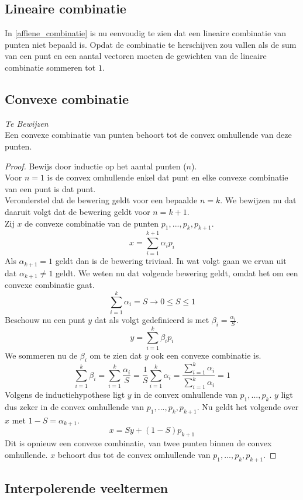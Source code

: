 \documentclass[tmi_notities.tex]{subfiles}
\begin{document}
\subsection{Lineaire combinatie}
In \ref{affiene_combinatie} is nu eenvoudig te zien dat een lineaire combinatie van punten niet bepaald is.
Opdat de combinatie te herschijven zou vallen als de sum van een punt en een aantal vectoren moeten de gewichten van de lineaire combinatie sommeren tot $1$. 

\subsection{Convexe combinatie}
\textit{Te Bewijzen}\\
Een convexe combinatie van punten behoort tot de convex omhullende van deze punten.
\begin{proof}
Bewijs door inductie op het aantal punten ($n$).\\
Voor $n=1$ is de convex omhullende enkel dat punt en elke convexe combinatie van een punt is dat punt.\\
Veronderstel dat de bewering geldt voor een bepaalde $n=k$. We bewijzen nu dat daaruit volgt dat de bewering geldt voor $n=k+1$.\\
Zij $x$ de convexe combinatie van de punten $p_1,...,p_k,p_{k+1}$.
\[
x = \sum_{i=1}^{k+1}\alpha_ip_i
\]
Als $\alpha_{k+1} = 1$ geldt dan is de bewering triviaal. In wat volgt gaan we ervan uit dat $\alpha_{k+1} \neq 1$ geldt.
We weten nu dat volgende bewering geldt, omdat het om een convexe combinatie gaat.
\[
\sum_{i=1}^{k}\alpha_i = S \rightarrow 0 \le S \le 1
\]
Beschouw nu een punt $y$ dat als volgt gedefinieerd is met $\beta_i = \frac{\alpha_i}{S}$.
\[
y = \sum_{i=1}^k\beta_{i}p_{i}
\]
We sommeren nu de $\beta_i$ om te zien dat $y$ ook een convexe combinatie is.
\[
\sum_{i=1}^k\beta_{i} = \sum_{i=1}^k \frac{\alpha_i}{S} = \frac{1}{S}\sum_{i=1}^k \alpha_i = \frac{\sum_{i=1}^{k}\alpha_i}{\sum_{i=1}^{k}\alpha_i} = 1
\]
Volgens de inductiehypothese ligt $y$ in de convex omhullende van $p_1,...,p_k$. $y$ ligt dus zeker in de convex omhullende van $p_1,...,p_k,p_{k+1}$. Nu geldt het volgende over $x$ met $1-S = \alpha_{k+1}$.
\[
x = Sy + (1-S)p_{k+1}
\]
Dit is opnieuw een convexe combinatie, van twee punten binnen de convex omhullende. $x$ behoort dus tot de convex omhullende van $p_1,...,p_k,p_{k+1}$. 
\end{proof}

\subsection{Interpolerende veeltermen}
\end{document}
